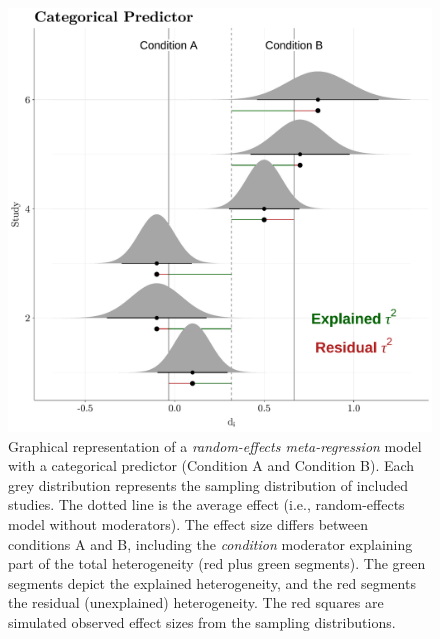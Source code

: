 \documentclass[
  man,floatsintext]{apa6}
\begin{document}
\begin{figure}[H]

{\centering \includegraphics[width=0.8\linewidth]{paper_files/figure-latex/img-metaregression-bin-1} 

}

\caption{Graphical representation of a \emph{random-effects meta-regression} model with a categorical predictor (Condition A and Condition B). Each grey distribution represents the sampling distribution of included studies. The dotted line is the average effect (i.e., random-effects model without moderators). The effect size differs between conditions A and B, including the \emph{condition} moderator explaining part of the total heterogeneity (red plus green segments). The green segments depict the explained heterogeneity, and the red segments the residual (unexplained) heterogeneity. \color{red} The red squares are simulated observed effect sizes from the sampling distributions. \color{black}}\label{fig:img-metaregression-bin}
\end{figure}

\normalsize

\scriptsize
\end{document}
